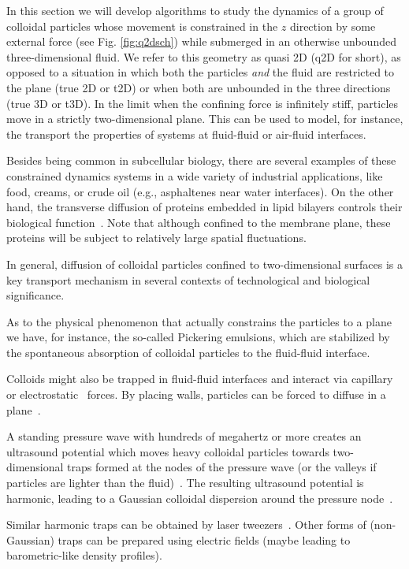 \documentclass[twoside,openright,titlepage,numbers=noenddot,%
headinclude,footinclude,cleardoublepage=empty,abstract=on,
BCOR=5mm,fontsize=11pt, dvipsnames, paper=b5
]{scrreprt}
\begin{document}
In this section we will develop algorithms to study the dynamics of a group of colloidal particles whose movement is constrained in the $z$ direction by some external force (see Fig. \ref{fig:q2dsch}) while submerged in an otherwise unbounded three-dimensional fluid. We refer to this geometry as quasi 2D (q2D for short), as opposed to a situation in which both the particles \emph{and} the fluid are restricted to the plane (true 2D or t2D) or when both are unbounded in the three directions (true 3D or t3D). In the limit when the confining force is infinitely stiff, particles move in a strictly two-dimensional plane. This can be used to model, for instance, the transport the properties of systems at fluid-fluid or air-fluid interfaces. 

Besides being common in subcellular biology, there are several examples of these constrained dynamics systems in a wide variety of industrial applications, like food, creams, or crude oil (e.g., asphaltenes near water interfaces).
On the other hand, the transverse diffusion of proteins embedded in lipid bilayers controls their biological function~\cite{Brown20112}.
Note that although confined to the membrane plane, these proteins will be subject to relatively large spatial fluctuations.

In general, diffusion of colloidal particles confined to two-dimensional surfaces is a key transport mechanism in several contexts of technological and biological significance.

As to the physical phenomenon that actually constrains the particles to a plane we have, for instance, the so-called Pickering emulsions, which are stabilized by the spontaneous absorption of colloidal particles to the fluid-fluid interface.

Colloids might also be trapped in fluid-fluid interfaces and interact via capillary~\cite{Dominguez2010} or electrostatic~\cite{Gao2016} forces. By placing walls, particles can be forced to diffuse in a plane~\cite{Lin2014}. 

A standing pressure wave with hundreds of megahertz or more creates an ultrasound potential which moves heavy colloidal particles towards two-dimensional traps formed at the nodes of the pressure wave (or the valleys if particles are lighter than the fluid)~\cite{Settnes2012,Balboa2013}. The resulting ultrasound potential is harmonic, leading to a Gaussian colloidal dispersion around the pressure node~\cite{Balboa2013}.

Similar harmonic traps can be obtained by laser tweezers~\cite{Ding2012}.
Other forms of (non-Gaussian) traps can be prepared using electric fields (maybe leading to barometric-like density profiles).
\end{document}
